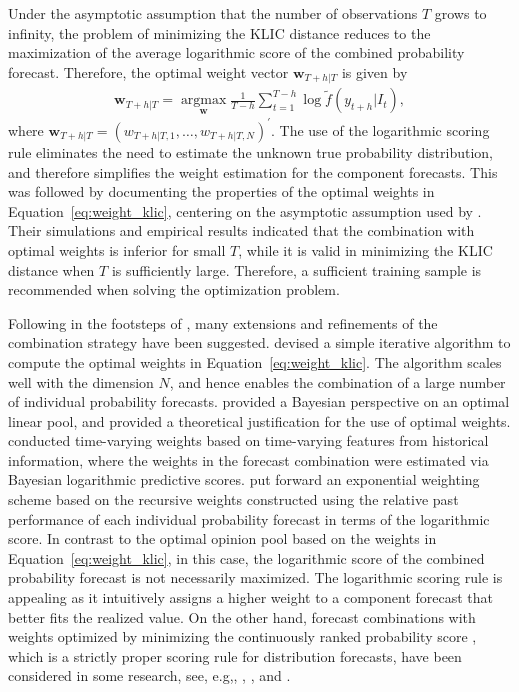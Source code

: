 \documentclass[a4paper,11pt]{article}
\begin{document}
Under the asymptotic assumption that the number of observations $T$ grows to infinity, the problem of minimizing the KLIC distance reduces to the maximization of the average logarithmic score of the combined probability forecast. Therefore, the optimal weight vector $\bm{w}_{T+h|T}$ is given by
\begin{align}
  \label{eq:weight_klic}
  \bm{w}_{T+h|T} = \underset{\bm{w}}{\operatorname{argmax}} \frac{1}{T-h} \sum_{t=1}^{T-h} \log \tilde{f}(y_{t+h}|I_{t}),
\end{align}
where $\bm{w}_{T+h|T}=\left(w_{T+h|T, 1}, \dots, w_{T+h|T, N}\right)^{\prime}$. The use of the logarithmic scoring rule eliminates the need to estimate the unknown true probability distribution, and therefore simplifies the weight estimation for the component forecasts. This was followed by \citet{Pauwels2016-ci} documenting the properties of the optimal weights in Equation~\eqref{eq:weight_klic}, centering on the asymptotic assumption used by \citet{Hall2007-lh}. Their simulations and empirical results indicated that the combination with optimal weights is inferior for small $T$, while it is valid in minimizing the KLIC distance when $T$ is sufficiently large. Therefore, a sufficient training sample is recommended when solving the optimization problem.

Following in the footsteps of \citet{Hall2007-lh}, many extensions and refinements of the combination strategy have been suggested. \citet{Conflitti2015-fq} devised a simple iterative algorithm to compute the optimal weights in Equation~\eqref{eq:weight_klic}. The algorithm scales well with the dimension $N$, and hence enables the combination of a large number of individual probability forecasts. \citet{Geweke2011-xk} provided a Bayesian perspective on an optimal linear pool, and provided a theoretical justification for the use of optimal weights. \citet{Li2021-gk} conducted time-varying weights based on time-varying features from historical information, where the weights in the forecast combination were estimated via Bayesian logarithmic predictive scores. \citet{Jore2010-yi} put forward an exponential weighting scheme based on the recursive weights constructed using the relative past performance of each individual probability forecast in terms of the logarithmic score. In contrast to the optimal opinion pool based on the weights in Equation~\eqref{eq:weight_klic}, in this case, the logarithmic score of the combined probability forecast is not necessarily maximized. The logarithmic scoring rule is appealing as it intuitively assigns a higher weight to a component forecast that better fits the realized value. On the other hand, forecast combinations with weights optimized by minimizing the continuously ranked probability score \citep[CRPS,][]{Gneiting2007-ij}, which is a strictly proper scoring rule for distribution forecasts, have been considered in some research, see, e.g,, \citet{Raftery2005-vu}, \citet{Thorey2017-on}, and \citet{Thorey2018-en}.
\end{document}
